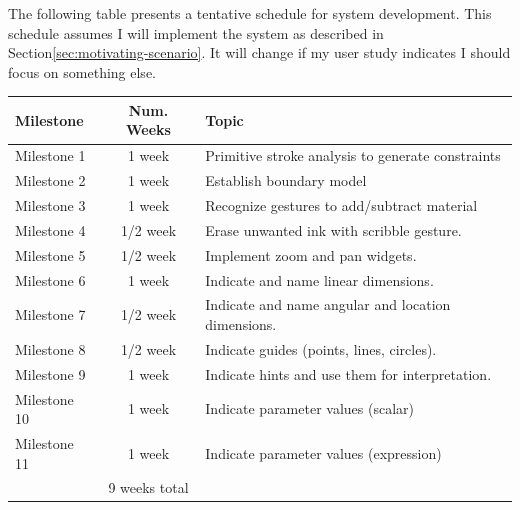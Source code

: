 \documentclass[11pt]{article}
\begin{document}
The following table presents a tentative schedule for system
development. This schedule assumes I will implement the system as
described in Section\ref{sec:motivating-scenario}. It will change if
my user study indicates I should focus on something else.

\vspace{12pt}
\begin{tabular}{ | l | c | l | }
  \hline

  \textbf{Milestone} & \textbf{Num. Weeks} & \textbf{Topic} \\

  \hline \hline

  Milestone 1 & 1 week & Primitive stroke analysis to generate constraints \\
  
  Milestone 2 & 1 week & Establish boundary model \\

  Milestone 3 & 1 week & Recognize gestures to add/subtract material \\

  Milestone 4 & 1/2 week & Erase unwanted ink with scribble gesture. \\

  Milestone 5 & 1/2 week & Implement zoom and pan widgets. \\ 

  Milestone 6 & 1 week & Indicate and name linear dimensions. \\

  Milestone 7 & 1/2 week & Indicate and name angular and location dimensions. \\

  Milestone 8 & 1/2 week & Indicate guides (points, lines, circles). \\ 

  Milestone 9 & 1 week & Indicate hints and use them for interpretation. \\ 

  Milestone 10 & 1 week & Indicate parameter values (scalar) \\ 

  Milestone 11 & 1 week & Indicate parameter values (expression) \\

  \hline
  
  & 9 weeks total & \\

  \hline

\end{tabular}
\vspace{12pt}
\end{document}
